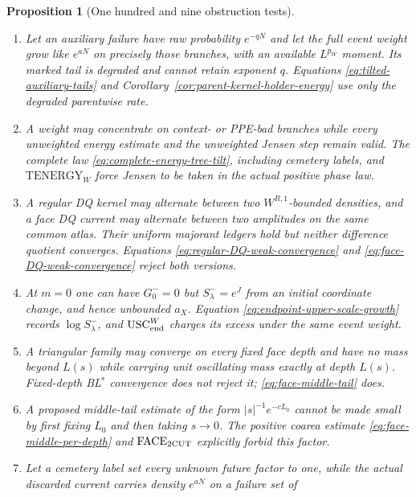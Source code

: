 \documentclass[11pt]{article}
\newtheorem{proposition}[theorem]{Proposition}
\begin{document}
\begin{proposition}[One hundred and nine obstruction tests]
\begin{enumerate}[label=\textup{(T\arabic*)}]
      The tilted estimate \eqref{eq:upper-scale-excess-tail}, or its explicit
      parent-kernel $\mathrm{KRH}_{p_W}$ sufficient condition, rejects this
      correlated-mark model.
\item Let an auxiliary failure have raw probability $e^{-qN}$ and let the
      full event weight grow like $e^{aN}$ on precisely those branches, with
      an available $L^{p_W}$ moment.  Its marked tail is degraded and cannot
      retain exponent $q$.  Equations
      \eqref{eq:tilted-auxiliary-tails} and
      Corollary~\ref{cor:parent-kernel-holder-energy} use only the degraded
      parentwise rate.
\item A weight may concentrate on context- or PPE-bad branches while every
      unweighted energy estimate and the unweighted Jensen step remain
      valid.  The complete law \eqref{eq:complete-energy-tree-tilt}, including
      cemetery labels, and $\mathrm{TENERGY}_{W}$ force Jensen to be taken in
      the actual positive phase law.
\item A regular DQ kernel may alternate between two
      $W^{R,1}$-bounded densities, and a face DQ current may alternate between
      two amplitudes on the same common atlas.  Their uniform majorant ledgers
      hold but neither difference quotient converges.  Equations
      \eqref{eq:regular-DQ-weak-convergence} and
      \eqref{eq:face-DQ-weak-convergence} reject both versions.
\item At $m=0$ one can have $G_0^-=0$ but
      $S_\lambda^-=e^J$ from an initial coordinate change, and hence
      unbounded $a_X$.  Equation \eqref{eq:endpoint-upper-scale-growth} records
      $\log S_\lambda^-$, and $\mathrm{USC}_{\rm end}^{W}$ charges its excess
      under the same event weight.
\item A triangular family may converge on every fixed face depth and have
      no mass beyond $L(s)$ while carrying unit oscillating mass exactly at
      depth $L(s)$.  Fixed-depth BL$^*$ convergence does not reject it;
      \eqref{eq:face-middle-tail} does.
\item A proposed middle-tail estimate of the form
      $|s|^{-1}e^{-cL_0}$ cannot be made small by first fixing $L_0$ and then
      taking $s\to0$.  The positive coarea estimate
      \eqref{eq:face-middle-per-depth} and
      $\mathrm{FACE}_{\rm 2CUT}$ explicitly forbid this factor.
\item Let a cemetery label set every unknown future factor to one, while the
      actual discarded current carries density $e^{aN}$ on a failure set of

\end{enumerate}
\end{proposition}
\end{document}
